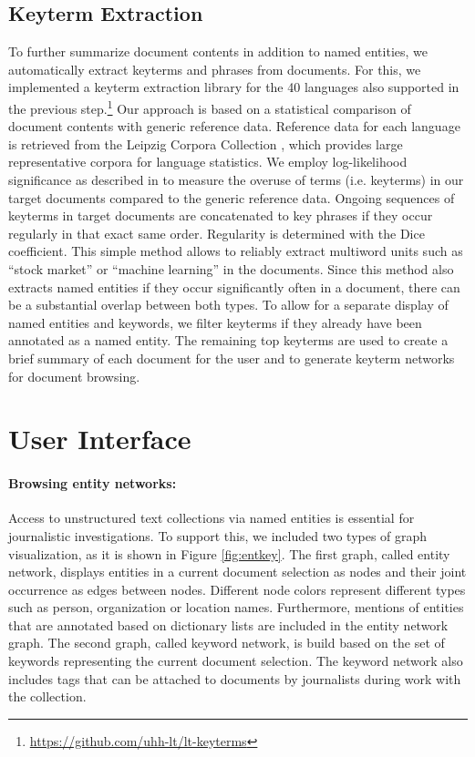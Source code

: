 \documentclass[11pt,a4paper]{article}
\begin{document}
\subsection{Keyterm Extraction}

To further summarize document contents in addition to named entities, we automatically extract keyterms and phrases from documents. For this, we implemented a keyterm extraction library for the 40 languages also supported in the previous step.\footnote{\url{https://github.com/uhh-lt/lt-keyterms}} Our approach is based on a statistical comparison of document contents with generic reference data. Reference data for each language is retrieved from the Leipzig Corpora Collection \cite{Goldhahn.2012}, which provides large representative corpora for language statistics. We employ log-likelihood significance as described in \cite{Rayson.2004} to measure the overuse of terms (i.e. keyterms) in our target documents compared to the generic reference data. Ongoing sequences of keyterms in target documents are concatenated to key phrases if they occur regularly in that exact same order. Regularity is determined with the Dice coefficient. This simple method allows to reliably extract multiword units such as ``stock market'' or ``machine learning'' in the documents. 
Since this method also extracts named entities if they occur significantly often in a document, there can be a substantial overlap between both types. To allow for a separate display of named entities and keywords, we filter keyterms if they already have been annotated as a named entity.
The remaining top keyterms are used to create a brief summary of each document for the user and to generate keyterm networks for document browsing.


    
\section{User Interface}
\label{entkey}

\paragraph{Browsing entity networks:}
Access to unstructured text collections via named entities is essential for journalistic investigations. To support this, we included two types of graph visualization, as it is shown in Figure \ref{fig:entkey}. The first graph, called entity network, displays entities in a current document selection as nodes and their joint occurrence as edges between nodes. Different node colors represent different types such as person, organization or location names. Furthermore, mentions of entities that are annotated based on dictionary lists are included in the entity network graph. The second graph, called keyword network, is build based on the set of keywords representing the current document selection. The keyword network also includes tags that can be attached to documents by journalists during work with the collection. 
\end{document}
